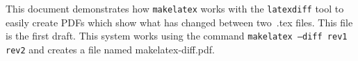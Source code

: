 \documentclass[letterpaper,12pt]{article}
\begin{document}
This document demonstrates how \texttt{makelatex} works with the \texttt{latexdiff} tool to easily create PDFs which show what has changed between two~.tex files. This file is the first draft. This system works using the command \texttt{makelatex --diff rev1 rev2} and creates a file named makelatex-diff.pdf.
\end{document}
